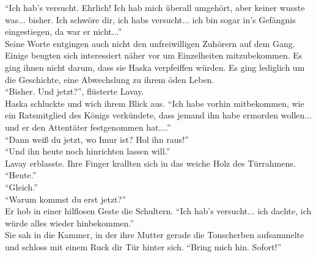 ``Ich hab's versucht. Ehrlich! Ich hab mich überall umgehört, aber keiner wusste was... bisher. Ich 
schwöre dir, ich habs versucht... ich bin sogar in's Gefängnis eingestiegen, da war er nicht...''\\
Seine Worte entgingen auch nicht den unfreiwilligen Zuhörern auf dem Gang. Einige beugten sich 
interessiert näher vor um Einzelheiten mitzubekommen. Es ging ihnen nicht darum, dass sie Haska 
verpfeiffen würden. Es ging lediglich um die Geschichte, eine Abwechslung zu ihrem öden Leben.\\
``Bisher. Und jetzt?'', flüsterte Lavay.\\
Haska schluckte und wich ihrem Blick aus. ``Ich habe vorhin mitbekommen, wie ein Ratsmitglied des 
Königs verkündete, dass jemand ihn habe ermorden wollen... und er den Attentäter festgenommen 
hat....''\\
``Dann weiß du jetzt, wo Imur ist? Hol ihn raus!''\\
``Und ihn heute noch hinrichten lassen will.''\\
Lavay erblasste. Ihre Finger krallten sich in das weiche Holz des Türrahmens. ``Heute.''\\
``Gleich.''\\
``Warum kommst du erst jetzt?''\\
Er hob in einer hilflosen Geste die Schultern. ``Ich hab's versucht... ich dachte, ich würde alles 
wieder hinbekommen.''\\
Sie sah in die Kammer, in der ihre Mutter gerade die Tonscherben aufsammelte und schloss mit einem 
Ruck dir Tür hinter sich. ``Bring mich hin. Sofort!''\\

